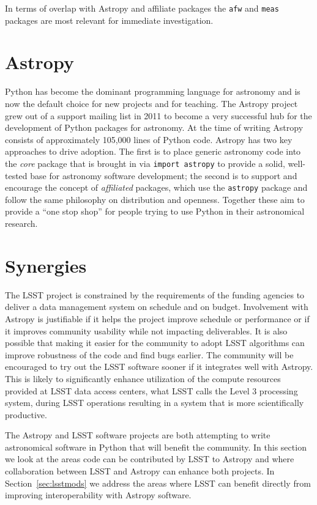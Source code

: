 \documentclass[]{spie}  %
\begin{document}
In terms of overlap with Astropy and affiliate packages the \texttt{afw} and \texttt{meas} packages are most relevant for immediate investigation.


\section{Astropy}

Python has become the dominant programming language for astronomy\cite{2000ASPC..216...59G,2006ASPC..351..343H,2006ASPC..351..497K,2011ASPC..442..425G,2012SPIE.8451E..02J} and is now the default choice for new projects and for teaching.
The Astropy\cite{2013A&A...558A..33A} project grew out of a support mailing list in 2011 to become a very successful hub for the development of Python packages for astronomy.
At the time of writing Astropy consists of approximately 105,000 lines of Python code.
Astropy has two key approaches to drive adoption.
The first is to place generic astronomy code into the \emph{core} package that is brought in via \texttt{import astropy} to provide a solid, well-tested base for astronomy software development; the second is to support and encourage the concept of \emph{affiliated} packages, which use the \texttt{astropy} package and follow the same philosophy on distribution and openness.
Together these aim to provide a ``one stop shop'' for people trying to use Python in their astronomical research.

\section{Synergies}

The LSST project is constrained by the requirements of the funding agencies to deliver a data management system on schedule and on budget.
Involvement with Astropy is justifiable if it helps the project improve schedule or performance or if it improves community usability while not impacting deliverables.
It is also possible that making it easier for the community to adopt LSST algorithms can improve robustness of the code and find bugs earlier.
The community will be encouraged to try out the LSST software sooner if it integrates well with Astropy.
This is likely to significantly enhance utilization of the compute resources provided at LSST data access centers, what LSST calls the Level 3 processing system, during LSST operations resulting in a system that is more scientifically productive.

The Astropy and LSST software projects are both attempting to write astronomical software in Python that will benefit the community.
In this section we look at the areas code can be contributed by LSST to Astropy and where collaboration between LSST and Astropy can enhance both projects.
In Section~\ref{sec:lsstmods} we address the areas where LSST can benefit directly from improving interoperability with Astropy software.
\end{document}
